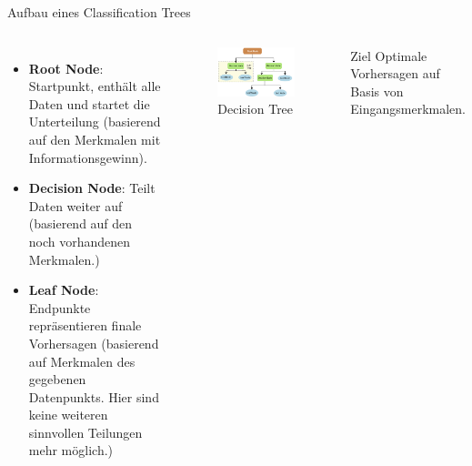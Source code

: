 \documentclass{beamer}
\begin{document}
\begin{frame}{Aufbau eines Classification Trees}

	\begin{columns}
			\begin{itemize}
				\item {\textbf{Root Node}: Startpunkt, enthält alle Daten und startet die Unterteilung (basierend auf den Merkmalen mit Informationsgewinn).}
				\item {\textbf{Decision Node}: Teilt Daten weiter auf (basierend auf den noch vorhandenen Merkmalen.)}
				\item {\textbf{Leaf Node}: Endpunkte repräsentieren finale Vorhersagen (basierend auf Merkmalen des gegebenen Datenpunkts. Hier sind keine weiteren sinnvollen Teilungen mehr möglich.)}
			\end{itemize}	
			
			\begin{figure}
			
				\includegraphics[width=\linewidth]{Images/tree.png}
				\caption{Decision Tree \cite{Charbuty2021ClassificationBO}}
			\end{figure}
			
			\pause
			\begin{alertblock}{Ziel}
				Optimale Vorhersagen auf Basis von Eingangsmerkmalen.			
			\end{alertblock}
	\end{columns}

\end{frame}
\end{document}
